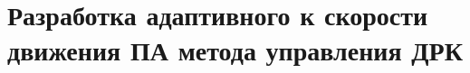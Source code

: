 \chapter{Разработка адаптивного к скорости движения ПА метода управления ДРК}\label{ch:Allocation}





